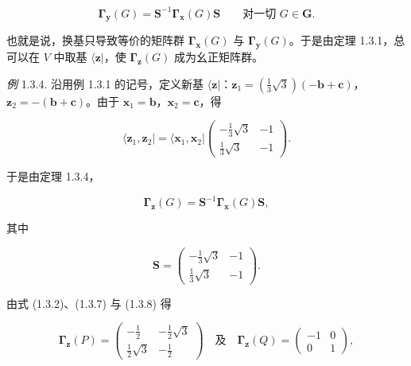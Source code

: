 \begin{equation*}
\mathbf{\Gamma}_{\mathbf{y}}(G) = \mathbf{S}^{-1}\mathbf{\Gamma}_{\mathbf{x}}(G)\mathbf{S} \qquad \textit{对一切 } G \in \mathbf{G}.
\tag{1.3.5}
\end{equation*}

也就是说，换基只导致等价的矩阵群 $\mathbf{\Gamma}_{\mathbf{x}}(G)$ 与 $\mathbf{\Gamma}_{\mathbf{y}}(G)$。于是由定理 1.3.1，总可以在 $V$ 中取基 $\langle \mathbf{z}|$，使 $\mathbf{\Gamma}_{\mathbf{z}}(G)$ 成为幺正矩阵群。

\textit{例} 1.3.4. 沿用例 1.3.1 的记号，定义新基 $\langle \mathbf{z}|$：$\mathbf{z}_{1} = \left(\tfrac{1}{3}\sqrt{3}\right)(-\mathbf{b} + \mathbf{c})$，$\mathbf{z}_{2} = -(\mathbf{b} + \mathbf{c})$。由于 $\mathbf{x}_{1} = \mathbf{b}$，$\mathbf{x}_{2} = \mathbf{c}$，得

\begin{equation*}
\langle \mathbf{z}_{1}, \mathbf{z}_{2}| = \langle \mathbf{x}_{1}, \mathbf{x}_{2}| \begin{pmatrix} -\tfrac{1}{3}\sqrt{3} & -1 \\ \tfrac{1}{3}\sqrt{3} & -1 \end{pmatrix}.
\tag{1.3.6}
\end{equation*}

于是由定理 1.3.4，

\begin{equation*}
\mathbf{\Gamma}_{\mathbf{z}}(G) = \mathbf{S}^{-1}\mathbf{\Gamma}_{\mathbf{x}}(G)\mathbf{S},
\tag{1.3.7}
\end{equation*}

其中

\begin{equation*}
\mathbf{S} = \begin{pmatrix} -\tfrac{1}{3}\sqrt{3} & -1 \\ \tfrac{1}{3}\sqrt{3} & -1 \end{pmatrix}.
\tag{1.3.8}
\end{equation*}

由式 (1.3.2)、(1.3.7) 与 (1.3.8) 得

\begin{equation*}
\mathbf{\Gamma}_{\mathbf{z}}(P) = \begin{pmatrix} -\tfrac{1}{2} & -\tfrac{1}{2}\sqrt{3} \\ \tfrac{1}{2}\sqrt{3} & -\tfrac{1}{2} \end{pmatrix} \quad \text{及} \quad \mathbf{\Gamma}_{\mathbf{z}}(Q) = \begin{pmatrix} -1 & 0 \\ 0 & 1 \end{pmatrix},
\tag{1.3.9}
\end{equation*}

